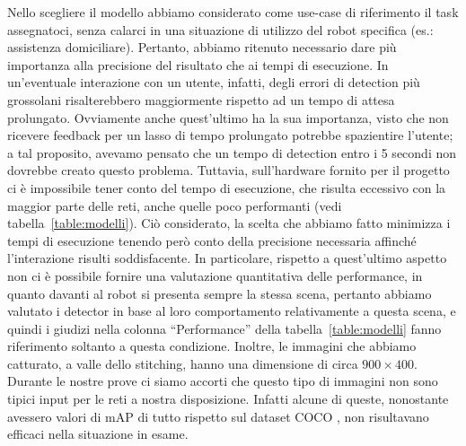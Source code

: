 Nello scegliere il modello abbiamo considerato come use-case di riferimento il task assegnatoci, senza calarci in una situazione di utilizzo del robot specifica (es.\@: assistenza domiciliare). Pertanto, abbiamo ritenuto necessario dare più importanza alla precisione del risultato che ai tempi di esecuzione. In un'eventuale interazione con un utente, infatti, degli errori di detection più grossolani risalterebbero maggiormente rispetto ad un tempo di attesa prolungato. Ovviamente anche quest'ultimo ha la sua importanza, visto che non ricevere feedback per un lasso di tempo prolungato potrebbe spazientire l'utente; a tal proposito, avevamo pensato che un tempo di detection entro i 5 secondi non dovrebbe creato questo problema.
Tuttavia, sull'hardware fornito per il progetto ci è impossibile tener conto del tempo di esecuzione, che risulta eccessivo con la maggior parte delle reti, anche quelle poco performanti (vedi tabella~\ref{table:modelli}). Ciò considerato, la scelta che abbiamo fatto minimizza i tempi di esecuzione tenendo però conto della precisione necessaria affinché l'interazione risulti soddisfacente.
In particolare, rispetto a quest’ultimo aspetto non ci è possibile fornire una valutazione quantitativa delle performance, in quanto davanti al robot si presenta sempre la stessa scena, pertanto abbiamo valutato i detector in base al loro comportamento relativamente a questa scena, e quindi i giudizi nella colonna “Performance” della tabella~\ref{table:modelli} fanno riferimento soltanto a questa condizione. Inoltre, le immagini che abbiamo catturato, a valle dello stitching, hanno una dimensione di circa $900 \times 400$. Durante le nostre prove ci siamo accorti che questo tipo di immagini non sono tipici input per le reti a nostra disposizione. Infatti alcune di queste, nonostante avessero valori di mAP di tutto rispetto sul dataset COCO \cite{modelzoo}, non risultavano efficaci nella situazione in esame.

